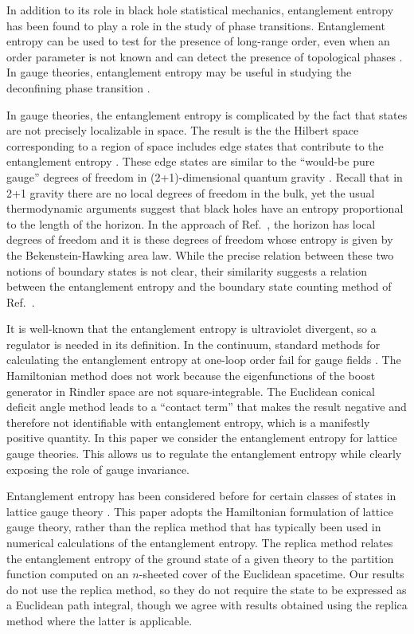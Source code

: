 \documentclass[aps,prd,twocolumn,showpacs,groupedaddress,nofootinbib,letterpaper]{revtex4}
\begin{document}
In addition to its role in black hole statistical mechanics, entanglement entropy has been found to play a role in the study of phase transitions.
Entanglement entropy can be used to test for the presence of long-range order, even when an order parameter is not known \cite{Osborne2002a,Vidal2003} and can detect the presence of topological phases \cite{Kitaev2005, Levin2006}.
In gauge theories, entanglement entropy may be useful in studying the deconfining phase transition \cite{Nishioka2006, Klebanov2007}.

In gauge theories, the entanglement entropy is complicated by the fact that states are not precisely localizable in space.
The result is the the Hilbert space corresponding to a region of space includes edge states that contribute to the entanglement entropy \cite{Balachandran1994, Buividovich2008b}.
These edge states are similar to the ``would-be pure gauge'' degrees of freedom in (2+1)-dimensional quantum gravity \cite{Carlip1994}.
Recall that in 2+1 gravity there are no local degrees of freedom in the bulk, yet the usual thermodynamic arguments suggest that black holes have an entropy proportional to the length of the horizon. 
In the approach of Ref.~\cite{Carlip1994}, the horizon has local degrees of freedom and it is these degrees of freedom whose entropy is given by the Bekenstein-Hawking area law.
While the precise relation between these two notions of boundary states is not clear, their similarity suggests a relation between the entanglement entropy and the boundary state counting method of Ref.~\cite{Carlip1994}.

It is well-known that the entanglement entropy is ultraviolet divergent, so a regulator is needed in its definition.
In the continuum, standard methods for calculating the entanglement entropy at one-loop order fail for gauge fields \cite{Kabat1995}.
The Hamiltonian method does not work because the eigenfunctions of the boost generator in Rindler space are not square-integrable. 
The Euclidean conical deficit angle method leads to a ``contact term'' that makes the result negative and therefore not identifiable with entanglement entropy, which is a manifestly positive quantity.
In this paper we consider the entanglement entropy for lattice gauge theories.
This allows us to regulate the entanglement entropy while clearly exposing the role of gauge invariance.

Entanglement entropy has been considered before for certain classes of states in lattice gauge theory \cite{Buividovich2008a, Buividovich2008b, Buividovich2008c, Velytsky2008a, Velytsky2008b}.
This paper adopts the Hamiltonian formulation of lattice gauge theory, rather than the replica method \cite{Callan1994} that has typically been used in numerical calculations of the entanglement entropy.
The replica method relates the entanglement entropy of the ground state of a given theory to the partition function computed on an $n$-sheeted cover of the Euclidean spacetime.
Our results do not use the replica method, so they do not require the state to be expressed as a Euclidean path integral, though we agree with results obtained using the replica method where the latter is applicable.
\end{document}

